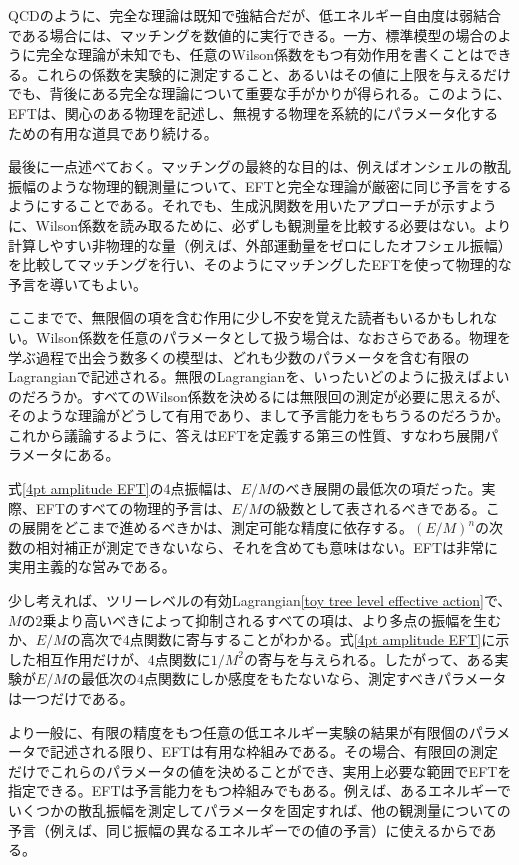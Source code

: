 QCDのように、完全な理論は既知で強結合だが、低エネルギー自由度は弱結合である場合には、マッチングを数値的に実行できる。一方、標準模型の場合のように完全な理論が未知でも、任意のWilson係数をもつ有効作用を書くことはできる。これらの係数を実験的に測定すること、あるいはその値に上限を与えるだけでも、背後にある完全な理論について重要な手がかりが得られる。このように、EFTは、関心のある物理を記述し、無視する物理を系統的にパラメータ化するための有用な道具であり続ける。

最後に一点述べておく。マッチングの最終的な目的は、例えばオンシェルの散乱振幅のような物理的観測量について、EFTと完全な理論が厳密に同じ予言をするようにすることである。それでも、生成汎関数を用いたアプローチが示すように、Wilson係数を読み取るために、必ずしも観測量を比較する必要はない。より計算しやすい非物理的な量（例えば、外部運動量をゼロにしたオフシェル振幅）を比較してマッチングを行い、そのようにマッチングしたEFTを使って物理的な予言を導いてもよい。
 





ここまでで、無限個の項を含む作用に少し不安を覚えた読者もいるかもしれない。Wilson係数を任意のパラメータとして扱う場合は、なおさらである。物理を学ぶ過程で出会う数多くの模型は、どれも少数のパラメータを含む有限のLagrangianで記述される。無限のLagrangianを、いったいどのように扱えばよいのだろうか。すべてのWilson係数を決めるには無限回の測定が必要に思えるが、そのような理論がどうして有用であり、まして予言能力をもちうるのだろうか。これから議論するように、答えはEFTを定義する第三の性質、すなわち展開パラメータにある。

式\eqref{4pt amplitude EFT}の4点振幅は、$E/M$のべき展開の最低次の項だった。実際、EFTのすべての物理的予言は、$E/M$の級数として表されるべきである。この展開をどこまで進めるべきかは、測定可能な精度に依存する。$(E/M)^n$の次数の相対補正が測定できないなら、それを含めても意味はない。EFTは非常に実用主義的な営みである。

少し考えれば、ツリーレベルの有効Lagrangian\eqref{toy tree level effective action}で、$M$の2乗より高いべきによって抑制されるすべての項は、より多点の振幅を生むか、$E/M$の高次で4点関数に寄与することがわかる。式\eqref{4pt amplitude EFT}に示した相互作用だけが、4点関数に$1/M^2$の寄与を与えられる。したがって、ある実験が$E/M$の最低次の4点関数にしか感度をもたないなら、測定すべきパラメータは一つだけである。

より一般に、有限の精度をもつ任意の低エネルギー実験の結果が有限個のパラメータで記述される限り、EFTは有用な枠組みである。その場合、有限回の測定だけでこれらのパラメータの値を決めることができ、実用上必要な範囲でEFTを指定できる。EFTは予言能力をもつ枠組みでもある。例えば、あるエネルギーでいくつかの散乱振幅を測定してパラメータを固定すれば、他の観測量についての予言（例えば、同じ振幅の異なるエネルギーでの値の予言）に使えるからである。

